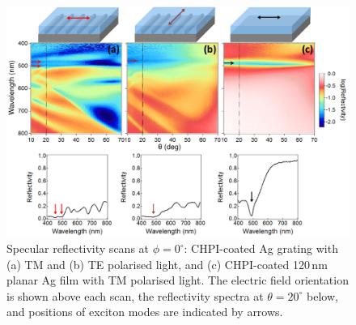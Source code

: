 \begin{figure}[h!] 
\centering    
\includegraphics[width=\textwidth]{Fig15}
\caption{Specular reflectivity scans at $\phi=0^{\circ}$: CHPI-coated Ag grating with (a) TM and (b) TE polarised light, and (c) CHPI-coated 120\,nm planar Ag film with TM polarised light. The electric field orientation is shown above each scan, the reflectivity spectra at $\theta=20^{\circ}$ below, and positions of exciton modes are indicated by arrows.}
\label{7Fig15}
\end{figure}

